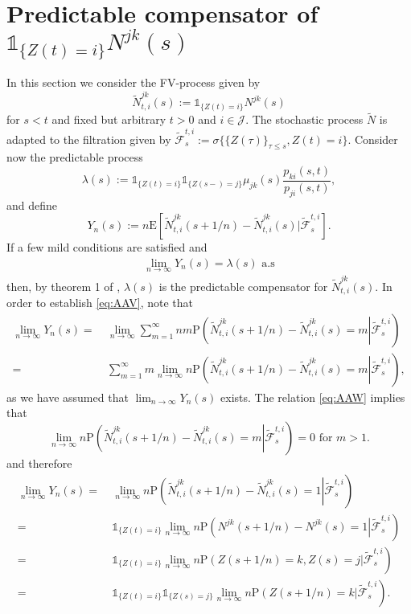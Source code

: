 \documentclass[12pt]{article}
\newcommand{\E}{\text{E}}
\newcommand{\indic}[1]{\mathds{1}_{ \{ #1 \} }}
\renewcommand{\P}{\text{P}}
\theoremstyle{my_thm}
\theoremstyle{my_rem}
\begin{document}
\section{Predictable compensator of $\indic{Z(t)=i} N^{jk}(s)$} \label{sec:pred}
In this section we consider the FV-process given by
$$
\tilde{N}^{jk}_{t,i}(s):=\indic{Z(t)=i} N^{jk}(s)
$$
for $s<t$ and fixed but arbitrary $t>0$ and $i \in \mathcal{J}$. The stochastic process $\tilde{N}$ is adapted to the filtration given by $\tilde{\mathcal{F}}_s^{t,i} := \sigma \{ \{Z(\tau) \}_{\tau\leq s}, Z(t)=i \}$. Consider now the predictable process
$$
\lambda(s):=\indic{Z(t)=i}\indic{Z(s-)=j}\mu_{jk}(s) \frac{p_{ki}(s,t)}{p_{ji}(s,t)},
$$
and define
$$
Y_n(s) := n\E\left[ \tilde{N}_{t,i}^{jk}(s+1/n)-\tilde{N}_{t,i}^{jk}(s)|\tilde{\mathcal{F}}_s^{t,i} \right].
$$
If a few mild conditions are satisfied and
\begin{align}
\lim_{n \rightarrow \infty} Y_n(s)=\lambda(s) \text{ a.s} \label{eq:AAV}
\end{align}
then, by theorem 1 of \citet{AvenT}, $\lambda(s)$ is the predictable compensator for $\tilde{N}^{jk}_{t,i}(s)$.
In order to establish \eqref{eq:AAV}, note that 
\begin{align*}
\lim_{n\rightarrow \infty} Y_n(s)= \ & \lim_{n\rightarrow \infty}  \sum_{m=1}^{\infty} n m \P \left. \left( \tilde{N}_{t,i}^{jk}(s+1/n)-\tilde{N}_{t,i}^{jk}(s) = m \right| \tilde{\mathcal{F}}_s^{t,i}  \right)
\\
= \ &
\sum_{m=1}^{\infty} m \lim_{n\rightarrow \infty} n \P \left. \left( \tilde{N}_{t,i}^{jk}(s+1/n)-\tilde{N}_{t,i}^{jk}(s) = m \right| \tilde{\mathcal{F}}_s^{t,i}  \right)
,
\end{align*}
as we have assumed that $\lim_{n\rightarrow \infty} Y_n(s)$ exists. The relation \eqref{eq:AAW} implies that
$$
\lim_{n\rightarrow \infty} n \P \left. \left( \tilde{N}_{t,i}^{jk}(s+1/n)-\tilde{N}_{t,i}^{jk}(s) = m \right| \tilde{\mathcal{F}}_s^{t,i}  \right) = 0 \text{ for } m >1.
$$
and therefore
\begin{align*}
\lim_{n\rightarrow \infty} Y_n(s) = \ & \lim_{n\rightarrow \infty} n \P \left. \left( \tilde{N}_{t,i}^{jk}(s+1/n)-\tilde{N}_{t,i}^{jk}(s) = 1 \right| \tilde{\mathcal{F}}_s^{t,i}  \right)
\\
= \ &
\indic{Z(t)=i}  \lim_{n\rightarrow \infty} n \P \left. \left( N^{jk}(s+1/n)-N^{jk}(s) = 1 \right| \tilde{\mathcal{F}}_s^{t,i}  \right)
\\
= \ &
\indic{Z(t)=i}  \lim_{n\rightarrow \infty} n \P \left. \left( Z(s+1/n)=k, Z(s)=j \right| \tilde{\mathcal{F}}_s^{t,i}  \right)
\\
= \ &
\indic{Z(t)=i} \indic{Z(s)=j} \lim_{n\rightarrow \infty} n \P \left. \left( Z(s+1/n)=k \right| \tilde{\mathcal{F}}_s^{t,i}  \right).
\end{align*}
\end{document}
